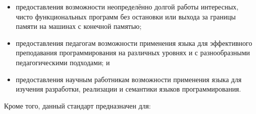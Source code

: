 \begin{itemize}
\item предоставления возможности неопределённо долгой работы интересных, чисто функциональных
  программ без остановки или выхода за границы памяти на машинах с конечной памятью;\vspace{-1.2mm}

\item предоставления педагогам возможности применения языка для эффективного преподавания
  программирования на различных уровнях и с разнообразными педагогическими подходами; и\vspace{-1.2mm}

\item предоставления научным работникам возможности применения языка для изучения разработки,
  реализации и семантики языков программирования.
\end{itemize}\vspace{-1.2mm}

Кроме того, данный стандарт предназначен для:\vspace{-1.2mm}

